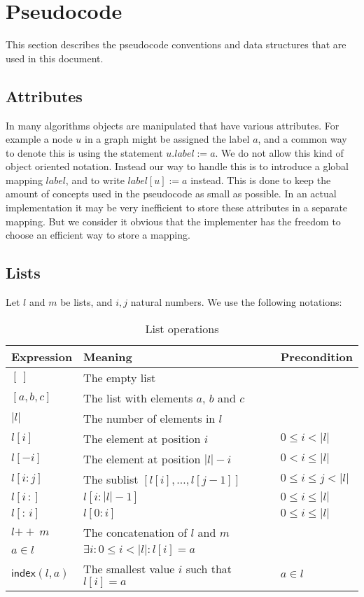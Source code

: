 \documentclass{article}
\newcommand{\func}[1]{\ensuremath{\textsf{#1}}} %
\newcommand{\var}[1]{\ensuremath{\textit{#1}}} %
\newcommand{\emptylist}{\ensuremath{[\:]}}
\newcommand{\concat}{\ensuremath{+\!\!+\:}}
\begin{document}
\section{Pseudocode} \label{sec:pseudocode}
This section describes the pseudocode conventions and data structures that are used in this document.

\subsection{Attributes}
In many algorithms objects are manipulated that have various attributes. For example a node $u$ in a graph might be assigned the label $a$, and a common way to denote this is using the statement $u.label := a$. We do not allow this kind of object oriented notation. Instead our way to handle this is to introduce a global mapping $\var{label}$, and to write $\var{label}[u] := a$ instead. This is done to keep the amount of concepts used in the pseudocode as small as possible. In an actual implementation it may be very inefficient to store these attributes in a separate mapping. But we consider it obvious that the implementer has the freedom to choose an efficient way to store a mapping.

\subsection{Lists}
Let $l$ and $m$ be lists, and $i,j$ natural numbers. We use the following notations:

\begin{table}[h!]
\centering
\begin{tabular}{||l | l | l||} 
 \hline
 \textbf{Expression} & \textbf{Meaning} & \textbf{Precondition} \\ [0.5ex] 
 \hline\hline
 $\emptylist$ & The empty list & \\
 $[a,b,c]$ & The list with elements $a$, $b$ and $c$ & \\
 $|l|$ & The number of elements in $l$ & \\
 $l[i]$ & The element at position $i$ & $0 \leq i < |l|$ \\
 $l[-i]$ & The element at position $|l| - i$ & $0 < i \leq |l|$ \\
 $l[i\mathbin{:}j]$ & The sublist $[ l[i], \ldots, l[j-1] ]$ & $0 \leq i \leq j < |l|$ \\
 $l[i\,{:}]$ & $l[i:|l|-1]$ & $0 \leq i \leq |l|$ \\
 $l[{:}\,i]$ & $l[0:i]$ & $0 \leq i \leq |l|$ \\
 $l \concat m$ & The concatenation of $l$ and $m$ & \\
 $a \in l$ & $\exists i: 0 \leq i < |l|: l[i] = a$ & \\
 $\func{index}(l, a)$ & The smallest value $i$ such that $l[i] = a$ & $a \in l$\\
 \hline
\end{tabular}
\caption{List operations}
\label{table:1}
\end{table}
\end{document}
